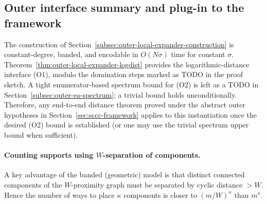 \subsection{Outer interface summary and plug-in to the framework}
\label{subsec:outer-local-expander-plug}

The construction of Section~\ref{subsec:outer-local-expander-construction} is constant-degree, banded, and encodable in
$O(N\sigma)$ time for constant $\sigma$.
Theorem~\ref{thm:outer-local-expander-logdist} provides the logarithmic-distance interface (O1), modulo the domination
steps marked as TODO in the proof sketch.
A tight enumerator-based spectrum bound for (O2) is left as a TODO in
Section~\ref{subsec:outer-ea-spectrum}; a trivial bound holds unconditionally.
Therefore, any end-to-end distance theorem proved under the abstract outer hypotheses in
Section~\ref{sec:sccc-framework} applies to this instantiation once the desired (O2) bound is established
(or one may use the trivial spectrum upper bound when sufficient).






%
%

\paragraph{Counting supports using $W$-separation of components.}
A key advantage of the banded (geometric) model is that distinct connected components of the $W$-proximity graph must be
separated by cyclic distance $>W$.
Hence the number of ways to place $\kappa$ components is closer to $(m/W)^\kappa$ than $m^\kappa$.

